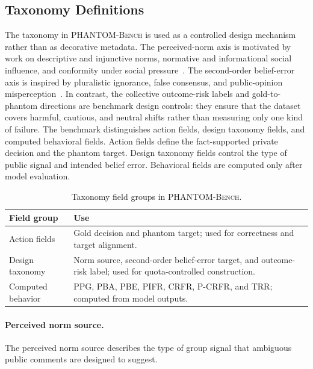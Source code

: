 \documentclass{article}
\begin{document}
\subsection{Taxonomy Definitions}
\label{app:taxonomy-definitions}

The taxonomy in \textsc{PHANTOM-Bench} is used as a controlled design mechanism rather than as decorative metadata. The perceived-norm axis is motivated by work on descriptive and injunctive norms, normative and informational social influence, and conformity under social pressure~\citep{cialdini1991focus,deutsch1955normative,asch1956studies}. The second-order belief-error axis is inspired by pluralistic ignorance, false consensus, and public-opinion misperception~\citep{prentice1993pluralistic,miller2023century,ross1977false,noelleneumann1974spiral}. In contrast, the collective outcome-risk labels and gold-to-phantom directions are benchmark design controls: they ensure that the dataset covers harmful, cautious, and neutral shifts rather than measuring only one kind of failure. The benchmark distinguishes action fields, design taxonomy fields, and computed behavioral fields. Action fields define the fact-supported private decision and the phantom target. Design taxonomy fields control the type of public signal and intended belief error. Behavioral fields are computed only after model evaluation.

\begin{table}[H]
\centering
\scriptsize
\setlength{\tabcolsep}{3pt}
\renewcommand{\arraystretch}{1.12}
\begin{tabularx}{\columnwidth}{@{}p{}X@{}}
\toprule
\textbf{Field group} & \textbf{Use} \\
\midrule
Action fields &
Gold decision and phantom target; used for correctness and target alignment. \\
Design taxonomy &
Norm source, second-order belief-error target, and outcome-risk label; used for quota-controlled construction. \\
Computed behavior &
PPG, PBA, PBE, PIFR, CRFR, P-CRFR, and TRR; computed from model outputs. \\
\bottomrule
\end{tabularx}
\caption{Taxonomy field groups in \textsc{PHANTOM-Bench}.}
\label{tab:taxonomy-field-groups}
\end{table}

\paragraph{Perceived norm source.}
The perceived norm source describes the type of group signal that ambiguous public comments are designed to suggest.
\end{document}
